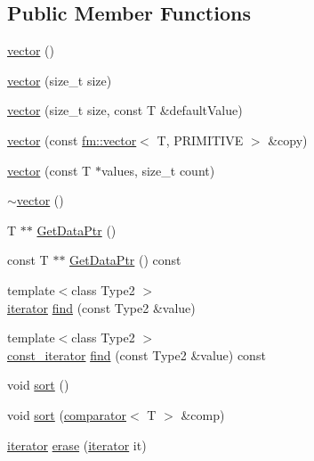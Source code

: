 \subsection*{Public Member Functions}
\begin{DoxyCompactItemize}
\item 
\hyperlink{classfm_1_1vector_ad13c06abcf94d19717e30a43886d04b3}{vector} ()
\item 
\hyperlink{classfm_1_1vector_a334b767de68f942804dae36683bdcf78}{vector} (size\_\-t size)
\item 
\hyperlink{classfm_1_1vector_ada7bc82716c6e8db53e7a2cab8910c53}{vector} (size\_\-t size, const T \&defaultValue)
\item 
\hyperlink{classfm_1_1vector_a227ba417e5173f16c374be41aced7c1e}{vector} (const \hyperlink{classfm_1_1vector}{fm::vector}$<$ T, PRIMITIVE $>$ \&copy)
\item 
\hyperlink{classfm_1_1vector_af033e8863f473af39dccb8a664a503b1}{vector} (const T $\ast$values, size\_\-t count)
\item 
\hyperlink{classfm_1_1vector_ab4a8259641ed380e139a191ecad9dd21}{$\sim$vector} ()
\item 
T $\ast$$\ast$ \hyperlink{classfm_1_1vector_ae4c229e0f702397af912accc1651f7fc}{GetDataPtr} ()
\item 
const T $\ast$$\ast$ \hyperlink{classfm_1_1vector_af79b001fec396c6463848b5c43cdd122}{GetDataPtr} () const 
\item 
{\footnotesize template$<$class Type2 $>$ }\\\hyperlink{classfm_1_1vector_a45a46984d2c34a4b3a21a8f8532fa213}{iterator} \hyperlink{classfm_1_1vector_a601c142c5f0d797c5b69d54a28ab2b55}{find} (const Type2 \&value)
\item 
{\footnotesize template$<$class Type2 $>$ }\\\hyperlink{classfm_1_1vector_aa012e8933574a62a4cc52e186a917722}{const\_\-iterator} \hyperlink{classfm_1_1vector_a60d10774cb4c20f632d82ede4f280c18}{find} (const Type2 \&value) const 
\item 
void \hyperlink{classfm_1_1vector_ad2e3e8c0186d09ec609bc17a2256c122}{sort} ()
\item 
void \hyperlink{classfm_1_1vector_aa4ea2a51f1b857b1808538d52de899c1}{sort} (\hyperlink{classfm_1_1comparator}{comparator}$<$ T $>$ \&comp)
\item 
\hyperlink{classfm_1_1vector_a45a46984d2c34a4b3a21a8f8532fa213}{iterator} \hyperlink{classfm_1_1vector_a4829ea7a2e242701c4583378c3bbe8b1}{erase} (\hyperlink{classfm_1_1vector_a45a46984d2c34a4b3a21a8f8532fa213}{iterator} it)

\end{DoxyCompactItemize}
